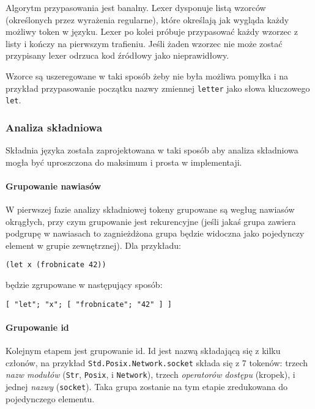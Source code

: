 Algorytm przypasowania jest banalny. Lexer dysponuje listą wzorców (określonych
przez wyrażenia regularne), które określają jak wygląda każdy możliwy token w
języku. Lexer po kolei próbuje przypasować każdy wzorzec z listy i kończy na
pierwszym trafieniu. Jeśli żaden wzorzec nie może zostać przypisany lexer
odrzuca kod źródłowy jako nieprawidłowy.

Wzorce są uszeregowane w taki sposób żeby nie była możliwa pomyłka i na przykład
przypasowanie początku nazwy zmiennej \texttt{letter} jako słowa kluczowego
\texttt{let}.

\subsubsection{Analiza składniowa}
\label{opis_etapow_kompilacji_analiza_skladniowa}

Składnia języka została zaprojektowana w taki sposób aby analiza składniowa mogła być uproszczona do maksimum
i prosta w implementaji.

\paragraph{Grupowanie nawiasów}

W pierwszej fazie analizy składniowej tokeny grupowane są wegług nawiasów okrągłych, przy czym grupowanie jest
rekurencyjne (jeśli jakaś grupa zawiera podgrupę w nawiasach to zagnieżdżona grupa będzie widoczna jako
pojedynczy element w grupie zewnętrznej).
Dla przykładu:

\begin{lstlisting}
(let x (frobnicate 42))
\end{lstlisting}

będzie zgrupowane w następujący sposób:

\begin{lstlisting}
[ "let"; "x"; [ "frobnicate"; "42" ] ]
\end{lstlisting}

\paragraph{Grupowanie id}

Kolejnym etapem jest grupowanie id. Id jest nazwą składającą się z kilku członów, na przykład
\texttt{Std.Posix.Network.socket} składa się z 7 tokenów: trzech \emph{nazw modułów} (\texttt{Str},
\texttt{Posix}, i \texttt{Network}), trzech \emph{operatorów dostępu} (kropek), i jednej \emph{nazwy}
(\texttt{socket}).
Taka grupa zostanie na tym etapie zredukowana do pojedynczego elementu.

